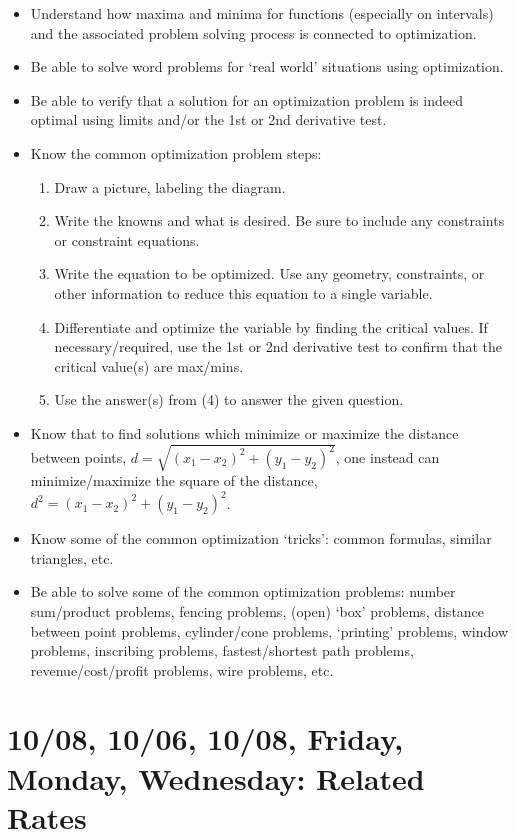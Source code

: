 \documentclass[11pt,letterpaper]{article}
\begin{document}
\begin{itemize}
\item Understand how maxima and minima for functions (especially on intervals) and the associated problem solving process is connected to optimization. 
\item Be able to solve word problems for `real world' situations using optimization.
\item Be able to verify that a solution for an optimization problem is indeed optimal using limits and/or the 1st or 2nd derivative test.
\item Know the common optimization problem steps:
	\begin{enumerate}[1.]
	\item Draw a picture, labeling the diagram.
	\item Write the knowns and what is desired. Be sure to include any constraints or constraint equations. 
	\item Write the equation to be optimized. Use any geometry, constraints, or other information to reduce this equation to a single variable.
	\item Differentiate and optimize the variable by finding the critical values. If necessary/required, use the 1st or 2nd derivative test to confirm that the critical value(s) are max/mins. 
	\item Use the answer(s) from (4) to answer the given question. 
	\end{enumerate}
\item Know that to find solutions which minimize or maximize the distance between points, $d= \sqrt{(x_1 - x_2)^2 + (y_1 - y_2)^2}$, one instead can minimize/maximize the square of the distance, $d^2= (x_1 - x_2)^2 + (y_1 - y_2)^2$.
\item Know some of the common optimization `tricks': common formulas, similar triangles, etc. 
\item Be able to solve some of the common optimization problems: number sum/product problems, fencing problems, (open) `box' problems, distance between point problems, cylinder/cone problems, `printing' problems, window problems, inscribing problems, fastest/shortest path problems, revenue/cost/profit problems, wire problems, etc. 
\end{itemize}

\newpage
\section*{10/08, 10/06, 10/08, Friday, Monday, Wednesday: Related Rates\label{10-03}}
\end{document}
